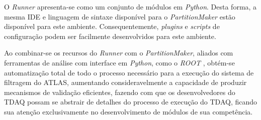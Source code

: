 O \emph{Runner} apresenta-se como um conjunto de módulos em \emph{Python}. Desta forma, a mesma IDE e linguagem de sintaxe disponível para o \emph{PartitionMaker} estão disponível para este ambiente. Consequentemente, \emph{plugins} e \emph{scripts} de configuração podem ser facilmente desenvolvidos para este ambiente.

Ao combinar-se os recursos do \emph{Runner} com o \emph{PartitionMaker}, aliados com ferramentas de análise com interface em \emph{Python}, como o \emph{ROOT} \cite{bib:root}, obtém-se automatização total de todo o processo necessário para a execução do sistema de filtragem do ATLAS, aumentando consideravelmente a capacidade de produzir mecanismos de validação eficientes, fazendo com que os desenvolvedores do TDAQ possam se abstrair de detalhes do processo de execução do TDAQ, ficando sua atenção exclusivamente no desenvolvimento de módulos de sua competência. 
